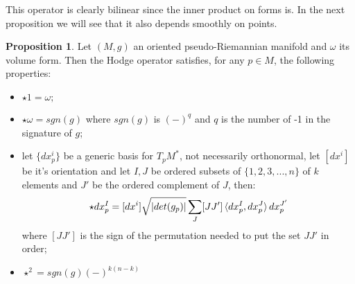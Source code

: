\documentclass[12pt,a4paper]{report}
\theoremstyle{definition}
\theoremstyle{Theorem}
\newtheorem{Prop}[Def]{Proposition}
\theoremstyle{definition}
\theoremstyle{definition}
\begin{document}
	This operator is clearly bilinear since the inner product on forms is. In the next proposition we will see that it also depends smoothly on points.
	\begin{Prop}\label{Prop_1.7.2}
		Let $(M,g)$ an oriented pseudo-Riemannian manifold and $\omega$ its volume form. Then the Hodge operator satisfies, for any $p\in M$, the following properties:
		\begin{itemize}
			\item $\star 1=\omega;$
			\item $\star\omega=sgn(g)$ where $sgn(g)$ is $(-)^q$ and $q$ is the number of -1 in the signature of $g$;
			\item let $\{dx^i_p\}$ be a generic basis for $T_pM^*$, not necessarily orthonormal, let $[dx^i]$ be it's orientation and let $I,J$ be ordered subsets of $\{1,2,3,...,n\}$ of $k$ elements and $J'$ be the ordered complement of $J$, then:
			$$\star dx_p^I=[dx^i]\sqrt{|det(g_p)|}\sum_J[JJ']\braket{dx_p^I,dx_p^J}dx_p^{J'}$$
			where $[JJ']$ is the sign of the permutation needed to put the set $JJ'$ in order;
			\item $\star^2=sgn(g)(-)^{k(n-k)}$
		\end{itemize}
	\end{Prop}
\end{document}
